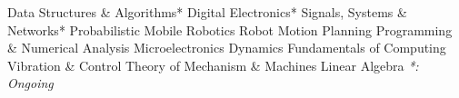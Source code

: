 \begin{cvcourses}
 \cvcourse
 {Data Structures \& Algorithms*}
 {Digital Electronics*}
 {Signals, Systems \& Networks*}
 \cvcourse
 {Probabilistic Mobile Robotics}
 {Robot Motion Planning}
 {Programming \& Numerical Analysis}
 \cvcourse
 {Microelectronics} 
 {Dynamics} 
 {Fundamentals of Computing}
 \cvcourse
 {Vibration \& Control}   
 {Theory of Mechanism \& Machines} 
 {Linear Algebra}
  \cvcoursefoot
  {\textit{*: Ongoing}}
  {}
  {}
  
\end{cvcourses}

